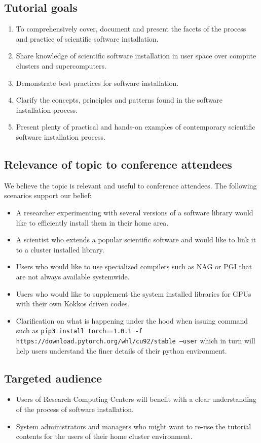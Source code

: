 \documentclass{report}
\begin{document}
\subsection*{Tutorial goals}
\begin{enumerate}
\item To comprehensively cover, document and present the facets of the process and practice of scientific software installation.
\item Share knowledge of scientific software installation in user space over compute clusters and supercomputers.
\item Demonstrate best practices for software installation.
\item Clarify the concepts, principles and patterns found in the software installation process.
\item Present plenty of practical and hands-on examples of contemporary scientific software installation process.
\end{enumerate}

\subsection*{Relevance of topic to conference attendees}
We believe the topic is relevant and useful to conference attendees. The following scenarios support our belief:
\begin{itemize}
\item A researcher experimenting with several versions of a software library would like to efficiently install them in their home area.
\item A scientist who extends a popular scientific software and would like to link it to a cluster installed library.
\item Users who would like to use specialized compilers such as NAG or PGI that are not always available systemwide.
\item Users who would like to supplement the system installed libraries for GPUs with their own Kokkos driven codes.
\item Clarification on what is happening under the hood when issuing command
such as \texttt{pip3 install torch==1.0.1 -f
https://download.pytorch.org/whl/cu92/stable --user} which in turn will help
users understand the finer details of their python environment. 
\end{itemize}

\subsection*{Targeted audience}
\begin{itemize}
\item Users of Research Computing Centers will benefit with a clear understanding of the process of software installation.
\item System administrators and managers who might want to re-use the tutorial contents for the users of their home cluster environment.
\end{itemize}
\end{document}
